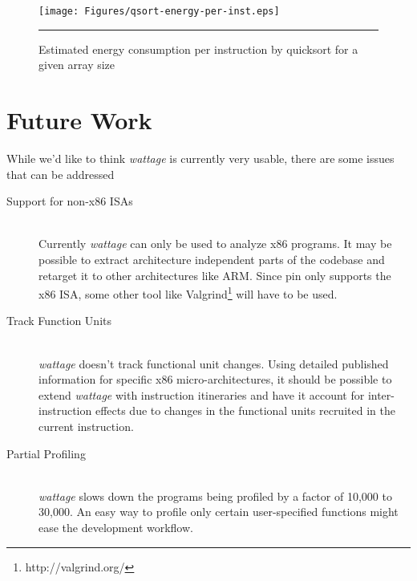 \begin{figure}[htbp]
  \centering
  \texttt{[image: Figures/qsort-energy-per-inst.eps]}
  \rule{35em}{0.5pt}
  \caption{Estimated energy consumption per instruction by quicksort
    for a given array size}
  \label{fig:qsort-energy-per-inst-per-array-length}
\end{figure}

\section{Future Work}

While we'd like to think \textit{wattage} is currently very usable,
there are some issues that can be addressed

\begin{description}
  \item[Support for non-x86 ISAs] \hfill \\ Currently \textit{wattage}
    can only be used to analyze x86 programs.  It may be possible to
    extract architecture independent parts of the codebase and
    retarget it to other architectures like ARM.  Since pin only
    supports the x86 ISA, some other tool like
    Valgrind\footnote{http://valgrind.org/} will have to be used.

  \item[Track Function Units] \hfill \\ \textit{wattage} doesn't track
    functional unit changes.  Using detailed published information for
    specific x86 micro-architectures, it should be possible to extend
    \textit{wattage} with instruction itineraries and have it account
    for inter-instruction effects due to changes in the functional
    units recruited in the current instruction.

  \item[Partial Profiling] \hfill \\ \textit{wattage} slows down the
    programs being profiled by a factor of 10,000 to 30,000.  An easy
    way to profile only certain user-specified functions might ease
    the development workflow.
\end{description}
